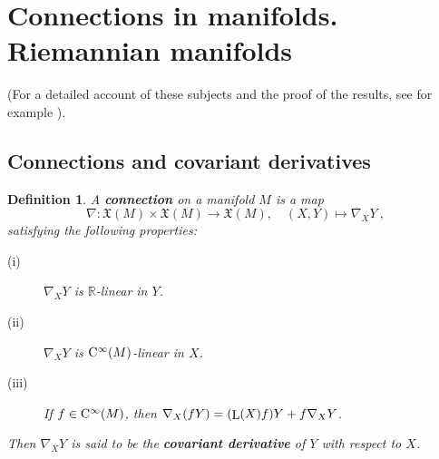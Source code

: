\documentclass[12pt]{report}
\newtheorem{definition}[teor]{Definition}
\def\vf{\mathfrak X}
\def\Real{\mathbb{R}}
\def\Lie{\mathop{\rm L}\nolimits}
\def\Cinfty{{\rm C}^\infty}
\begin{document}
\section{Connections in manifolds. Riemannian manifolds}
\label{conexion}


(For a detailed account of these subjects and the proof of the results, see for example 
\cite{Con2001,GHV-72,Lang-95,Lee2013, Lee2018,GN-2014,Sp-72}).


\subsection{Connections and covariant derivatives}


\begin{definition}
A \textbf{connection} on a manifold $M$ is a map
$$
\nabla\colon\vf(M)\times\vf(M)\to\vf(M) ,\quad (X,Y)\mapsto \nabla_X Y \ ,
$$
satisfying the following properties:
\begin{description}
\item[{\rm (i)}] $\nabla_X Y$ is $\Real$-linear in $Y$.
\item[{\rm (ii)}]  $\nabla_X Y$ is $\Cinfty(M)$-linear in $X$.
\item[{\rm (iii)}] If $f\in\Cinfty(M)$, then $\nabla_X (fY)=(\Lie(X)f)Y+f\nabla_X Y$.
\end{description}
Then $\nabla_X Y$ is said to be the \textbf{covariant derivative} of $Y$ with respect to $X$.
\end{definition}
\end{document}
